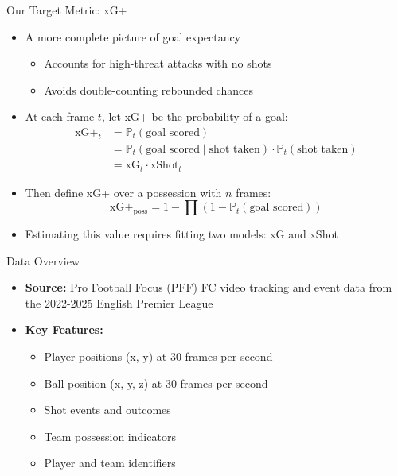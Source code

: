 \documentclass{beamer}
\begin{document}
\begin{frame}{Our Target Metric: xG+}
\begin{itemize}
\item A more complete picture of goal expectancy
  \begin{itemize}
  \item Accounts for high-threat attacks with no shots
  \item Avoids double-counting rebounded chances
  \end{itemize}
\item At each frame $t$, let xG+ be the probability of a goal:
\begin{align*}
\text{xG+}_t &= \mathbb{P}_t(\text{goal scored}) \\
&= \mathbb{P}_t(\text{goal scored} \mid \text{shot taken})\cdot\mathbb{P}_t(\text{shot taken}) \\
&= \text{xG}_t\cdot\text{xShot}_t
\end{align*}
\item Then define xG+ over a possession with $n$ frames:
$$\text{xG+}_\text{poss} = 1 - \prod \left(1 - \mathbb{P}_t\left(\text{goal scored}\right)\right)$$
\item Estimating this value requires fitting two models: xG and xShot
\end{itemize}
\end{frame}

\begin{frame}{Data Overview}
\begin{itemize}
\item \textbf{Source:} Pro Football Focus (PFF) FC video tracking and event data from the 2022-2025 English Premier League
\item \textbf{Key Features:}
  \begin{itemize}
  \item Player positions (x, y) at 30 frames per second
  \item Ball position (x, y, z) at 30 frames per second
  \item Shot events and outcomes
  \item Team possession indicators
  \item Player and team identifiers
  \end{itemize}
\end{itemize}
\end{frame}
\end{document}
